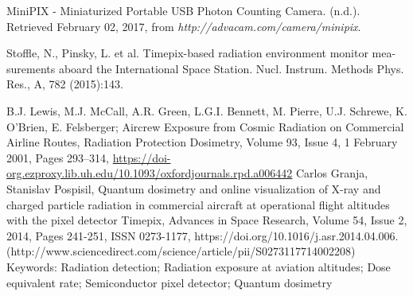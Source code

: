 \documentclass[final,1p, times, twocolumn]{elsarticle}
\begin{document}
\begin{thebibliography}{00}



MiniPIX - Miniaturized Portable USB Photon Counting Camera. (n.d.). Retrieved February 02, 2017, from \textit{http://advacam.com/camera/minipix}.

 Stoffle, N., Pinsky, L. et al. Timepix-based radiation environment monitor mea-
surements aboard the International Space Station. Nucl. Instrum. Methods Phys.
Res., A, 782 (2015):143.

 B.J. Lewis, M.J. McCall, A.R. Green, L.G.I. Bennett, M. Pierre, U.J. Schrewe, K. O'Brien, E. Felsberger; Aircrew Exposure from Cosmic Radiation on Commercial Airline Routes, Radiation Protection Dosimetry, Volume 93, Issue 4, 1 February 2001, Pages 293–314, \url{https://doi-org.ezproxy.lib.uh.edu/10.1093/oxfordjournals.rpd.a006442}
 Carlos Granja, Stanislav Pospisil,
Quantum dosimetry and online visualization of X-ray and charged particle radiation in commercial aircraft at operational flight altitudes with the pixel detector Timepix,
Advances in Space Research,
Volume 54, Issue 2,
2014,
Pages 241-251,
ISSN 0273-1177,
https://doi.org/10.1016/j.asr.2014.04.006.
(http://www.sciencedirect.com/science/article/pii/S0273117714002208)
Keywords: Radiation detection; Radiation exposure at aviation altitudes; Dose equivalent rate; Semiconductor pixel detector; Quantum dosimetry


\end{thebibliography}
\end{document}
